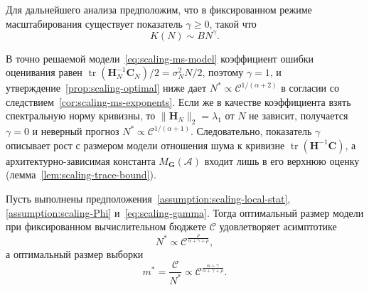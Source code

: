 Для дальнейшего анализа предположим, что в фиксированном режиме масштабирования существует показатель $\gamma \ge 0$, такой что
\begin{equation}
    \label{eq:scaling-gamma}
    K(N)\sim B N^{\gamma}.
\end{equation}

\begin{remark}
    \label{rem:scaling-gamma-meaning}
    В точно решаемой модели~\eqref{eq:scaling-ms-model} коэффициент ошибки оценивания равен $\operatorname{tr}(\mathbf H_N^{-1}\mathbf C_N)/2 = \sigma_N^2 N/2$, поэтому $\gamma = 1$, и утверждение~\ref{prop:scaling-optimal} ниже дает $N^* \propto \mathcal C^{1/(\alpha+2)}$ в согласии со следствием~\ref{cor:scaling-ms-exponents}. Если же в качестве коэффициента взять спектральную норму кривизны, то $\|\mathbf H_N\|_2 = \lambda_1$ от $N$ не зависит, получается $\gamma = 0$ и неверный прогноз $N^* \propto \mathcal C^{1/(\alpha+1)}$. Следовательно, показатель $\gamma$ описывает рост с размером модели отношения шума к кривизне $\operatorname{tr}(\mathbf H^{-1}\mathbf C)$, а архитектурно-зависимая константа $M_{\mathbf G}(\mathcal A)$ входит лишь в его верхнюю оценку (лемма~\ref{lem:scaling-trace-bound}).
\end{remark}

\begin{proposition}
    \label{prop:scaling-optimal}
    Пусть выполнены предположения~\ref{assumption:scaling-local-stat}, \ref{assumption:scaling-Phi} и~\eqref{eq:scaling-gamma}. Тогда оптимальный размер модели при фиксированном вычислительном бюджете $\mathcal C$ удовлетворяет асимптотике
    \begin{equation}
        \label{eq:scaling-N-opt}
        N^*
        \propto
        \mathcal C^{\frac{\rho}{\alpha+\gamma+\rho}},
    \end{equation}
    а оптимальный размер выборки
    \begin{equation}
        \label{eq:scaling-m-opt}
        m^*
        =
        \frac{\mathcal C}{N^*}
        \propto
        \mathcal C^{\frac{\alpha+\gamma}{\alpha+\gamma+\rho}}.
    \end{equation}
\end{proposition}

